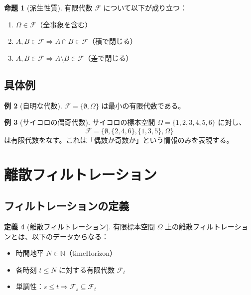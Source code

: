 \documentclass[a4paper,12pt]{ltjsarticle}
\theoremstyle{definition}
\newtheorem{definition}{定義}[section]
\newtheorem{proposition}[definition]{命題}
\newtheorem{example}[definition]{例}
\begin{document}
\begin{proposition}[派生性質]
有限代数 $\mathcal{F}$ について以下が成り立つ：
\begin{enumerate}
\item $\Omega \in \mathcal{F}$（全事象を含む）
\item $A, B \in \mathcal{F} \Rightarrow A \cap B \in \mathcal{F}$（積で閉じる）
\item $A, B \in \mathcal{F} \Rightarrow A \setminus B \in \mathcal{F}$（差で閉じる）
\end{enumerate}
\end{proposition}

\subsection{具体例}

\begin{example}[自明な代数]
$\mathcal{F} = \{\emptyset, \Omega\}$ は最小の有限代数である。
\end{example}

\begin{example}[サイコロの偶奇代数]
サイコロの標本空間 $\Omega = \{1,2,3,4,5,6\}$ に対し、
\[
\mathcal{F} = \{\emptyset, \{2,4,6\}, \{1,3,5\}, \Omega\}
\]
は有限代数をなす。これは「偶数か奇数か」という情報のみを表現する。
\end{example}

\section{離散フィルトレーション}

\subsection{フィルトレーションの定義}

\begin{definition}[離散フィルトレーション]
有限標本空間 $\Omega$ 上の離散フィルトレーションとは、以下のデータからなる：
\begin{itemize}
\item 時間地平 $N \in \mathbb{N}$（timeHorizon）
\item 各時刻 $t \leq N$ に対する有限代数 $\mathcal{F}_t$
\item 単調性：$s \leq t \Rightarrow \mathcal{F}_s \subseteq \mathcal{F}_t$
\end{itemize}
\end{definition}
\end{document}
